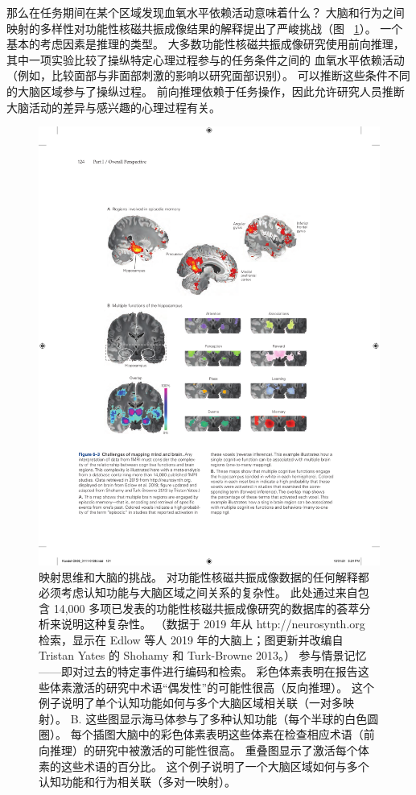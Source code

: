 那么在任务期间在某个区域发现血氧水平依赖活动意味着什么？
大脑和行为之间映射的多样性对功能性核磁共振成像结果的解释提出了严峻挑战（图 ~\ref{fig:6_3}）。 
一个基本的考虑因素是推理的类型。 
大多数功能性核磁共振成像研究使用前向推理，其中一项实验比较了操纵特定心理过程参与的任务条件之间的 血氧水平依赖活动（例如，比较面部与非面部刺激的影响以研究面部识别）。
可以推断这些条件不同的大脑区域参与了操纵过程。
前向推理依赖于任务操作，因此允许研究人员推断大脑活动的差异与感兴趣的心理过程有关。


\begin{figure}[htbp]
	\centering
	\includegraphics[width=1.0\linewidth]{chap06/fig_6_3}
	\caption{映射思维和大脑的挑战。 
		对功能性核磁共振成像数据的任何解释都必须考虑认知功能与大脑区域之间关系的复杂性。 
		此处通过来自包含 14,000 多项已发表的功能性核磁共振成像研究的数据库的荟萃分析来说明这种复杂性。 
		（数据于 2019 年从 http://neurosynth.org 检索，显示在 Edlow 等人 2019 年的大脑上；图更新并改编自 Tristan Yates 的 Shohamy 和 Turk-Browne 2013。） 参与情景记忆——即对过去的特定事件进行编码和检索。 
		彩色体素表明在报告这些体素激活的研究中术语“偶发性”的可能性很高（反向推理）。 
		这个例子说明了单个认知功能如何与多个大脑区域相关联（一对多映射）。 
		B. 这些图显示海马体参与了多种认知功能（每个半球的白色圆圈）。 
		每个插图大脑中的彩色体素表明这些体素在检查相应术语（前向推理）的研究中被激活的可能性很高。 
		重叠图显示了激活每个体素的这些术语的百分比。 
		这个例子说明了一个大脑区域如何与多个认知功能和行为相关联（多对一映射）。}
	\label{fig:6_3}
\end{figure}


